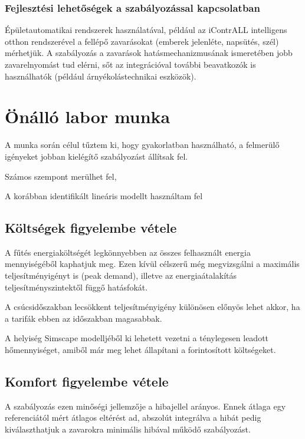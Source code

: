 \subsection{Fejlesztési lehetőségek a szabályozással kapcsolatban}
	
Épületautomatikai rendszerek használatával, például az iContrALL intelligens otthon rendszerével a fellépő zavarásokat (emberek jelenléte, napsütés, szél) mérhetjük. A szabályozás a zavarások hatásmechanizmusának ismeretében jobb zavarelnyomást tud elérni, sőt az integrációval további beavatkozók is használhatók (például árnyékolástechnikai eszközök).

\pagebreak

\chapter{Önálló labor munka}



\pagebreak

A munka során célul tűztem ki, hogy gyakorlatban használható, a felmerülő igényeket jobban kielégítő szabályozást állítsak fel.

Számos szempont merülhet fel,



A korábban identifikált lineáris modellt használtam fel


\section{Költségek figyelembe vétele}

A fűtés energiaköltségét legkönnyebben az összes felhasznált energia mennyiségéből kaphatjuk meg. Ezen kívül célszerű még megvizsgálni a maximális teljesítményigényt is (peak demand), illetve az energiaátalakítás teljesítményszintektől függő hatásfokát.

A csúcsidőszakban lecsökkent teljesítményigény különösen előnyös lehet akkor, ha a tarifák ebben az időszakban magasabbak.


A helyiség Simscape modelljéből ki lehetett vezetni a ténylegesen leadott hőmennyiséget, amiből már meg lehet állapítani a forintosított költségeket.


\section{Komfort figyelembe vétele}

A szabályozás ezen minőségi jellemzője a hibajellel arányos. Ennek átlaga egy referenciától mért átlagos eltérést ad, abszolút integrálva a hibát pedig kiválaszthatjuk a zavarokra minimális hibával működő szabályozást.

